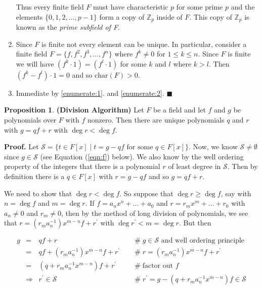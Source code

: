\documentclass{article}
\theoremstyle{definition}
\newtheorem{proposition}{Proposition}[section]
\begin{document}
\begin{enumerate}
Thus every finite field $F$ must have characteristic $p$ for some
prime $p$ and the elements $\{0,1,2,\hdots,p-1\}$ form a copy of
$\mathbb{Z}_p$ inside of $F$. This copy of $\mathbb{Z}_p$ is
known as the \emph{prime subfield of F}.

\item Since $F$ is finite not every element can be unique. In
particular, consider a finite field $F = \{f, f^2, f^3, \hdots,
f^n\}$ where $f^k \neq 0$ for $1 \leq k \leq n$.  Since $F$ is
finite we will have $(f^k \cdot 1) = (f^l \cdot 1)$ for some $k$
and $l$ where $k > l$.  Then $(f^k - f^l ) \cdot 1 = 0$ and so
$\text{char}(F) > 0$.
\label{enumerate:2}

\item Immediate by \ref{enumerate:1}. and \ref{enumerate:2}. $\blacksquare$
\end{enumerate}


\begin{proposition} \textbf{(Division Algorithm)}
Let $F$ be a field and let $f$ and $g$ be polynomials over $F$
with $f$ nonzero. Then there are unique polynomials $q$ and $r$
with $g = qf + r$ 
with $\deg r  < \deg f$.
\end{proposition}

\noindent
\textbf{Proof.}  Let $\mathcal{S} = \{t \in F[x] \mid t = g - qf
\text{ for some } q \in F[x] \}$. Now, we know $\mathcal{S} \neq
\emptyset$ since $g \in \mathcal{S}$ (see Equation (\ref{eqn:f})
below). We also know by the well ordering property of the
integers \cite{well_ordering_principle} that there is a
polynomial $r$ of least degree in $\mathcal{S}$. Then by
definition there is a $q \in F[x]$ with $r = g - qf$ and so $g =
qf +r$.

\bigskip
\noindent
We need to show that $\deg r < \deg f$. So suppose that $\deg r
\geq \deg f$, say with $n = \deg f$ and $m = \deg r$.  If $f =
a_nx^n + \hdots +a_0$ and $r = r_mx^m + \hdots +r_0$ with $a_n
\neq 0$ and $r_m \neq 0$, then by the method of long division of
polynomials, we see that $r = (r_m a_n^{-1})x^{m - n} f +
r^\prime$ with $\deg r^\prime < m = \deg r$. But then


\begin{equation*}
\begin{array}{rcll}
g
&=& qf + r                                      
			&\quad \mathrel{\#} g \in \mathcal{S} \text{ and well ordering principle} \\
[5pt]
&=& qf + (r_m a_n^{-1}) x^{m - n}f + r^\prime   
			&\quad \mathrel{\#}  r = (r_m a_n^{-1})x^{m - n} f + r^\prime \\
[5pt]
&=& (q + r_m a_n^{-1} x^{m - n}) f + r^\prime   
			&\quad \mathrel{\#} \text{factor out $f$} \\
[5pt]
&\Rightarrow& r^\prime \in \mathcal{S}             
			&\quad \mathrel{\#} r^\prime = g - (q + r_m a_n^{-1} x^{m - n}) f \in \mathcal{S}
\end{array}
\end{equation*}
\end{document}
